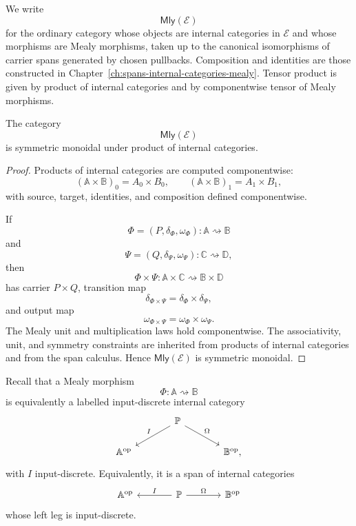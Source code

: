We write
\[
\mathsf{Mly}(\mathcal E)
\]
for the ordinary category whose objects are internal categories in
\(\mathcal E\) and whose morphisms are Mealy morphisms, taken up to the
canonical isomorphisms of carrier spans generated by chosen pullbacks.
Composition and identities are those constructed in
Chapter~\ref{ch:spans-internal-categories-mealy}.  Tensor product is given by
product of internal categories and by componentwise tensor of Mealy morphisms.

\begin{proposition}
\label{prop:mly-symmetric-monoidal}
The category
\[
\mathsf{Mly}(\mathcal E)
\]
is symmetric monoidal under product of internal categories.
\end{proposition}

\begin{proof}
Products of internal categories are computed componentwise:
\[
(\mathbb A\times\mathbb B)_0=A_0\times B_0,
\qquad
(\mathbb A\times\mathbb B)_1=A_1\times B_1,
\]
with source, target, identities, and composition defined componentwise.

If
\[
\Phi=(P,\delta_\Phi,\omega_\Phi):
\mathbb A\rightsquigarrow\mathbb B
\]
and
\[
\Psi=(Q,\delta_\Psi,\omega_\Psi):
\mathbb C\rightsquigarrow\mathbb D,
\]
then
\[
\Phi\times\Psi:
\mathbb A\times\mathbb C
\rightsquigarrow
\mathbb B\times\mathbb D
\]
has carrier \(P\times Q\), transition map
\[
\delta_{\Phi\times\Psi}
=
\delta_\Phi\times\delta_\Psi,
\]
and output map
\[
\omega_{\Phi\times\Psi}
=
\omega_\Phi\times\omega_\Psi.
\]
The Mealy unit and multiplication laws hold componentwise.  The associativity,
unit, and symmetry constraints are inherited from products of internal
categories and from the span calculus.  Hence
\(\mathsf{Mly}(\mathcal E)\) is symmetric monoidal.
\end{proof}

Recall that a Mealy morphism
\[
\Phi:\mathbb A\rightsquigarrow\mathbb B
\]
is equivalently a labelled input-discrete internal category
\[
\begin{tikzcd}[column sep=large]
&
\mathbb P
  \arrow[dl, "I"']
  \arrow[dr, "\Omega"]
\\
\mathbb A^{\mathrm{op}}
&&
\mathbb B^{\mathrm{op}},
\end{tikzcd}
\]
with \(I\) input-discrete.  Equivalently, it is a span of internal categories
\[
\begin{tikzcd}[column sep=large]
\mathbb A^{\mathrm{op}}
&
\mathbb P
  \arrow[l, "I"']
  \arrow[r, "\Omega"]
&
\mathbb B^{\mathrm{op}}
\end{tikzcd}
\]
whose left leg is input-discrete.

